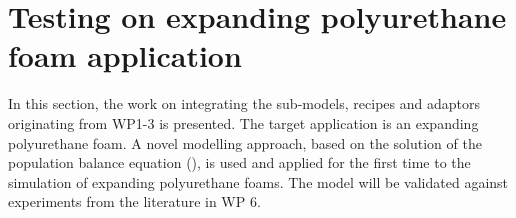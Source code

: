 \section{Testing on expanding polyurethane foam application}
\label{sec:0Dmodel}

In this section, the work on integrating the sub-models, recipes and adaptors
originating from WP1-3 is presented. The target application is an expanding
polyurethane foam.  A novel modelling approach, based on the solution of the
population balance equation ({\PopulationBalanceEquation}), is used and applied
for the first time to the simulation of expanding polyurethane foams.  The model
will be validated against experiments from the literature in WP 6.

